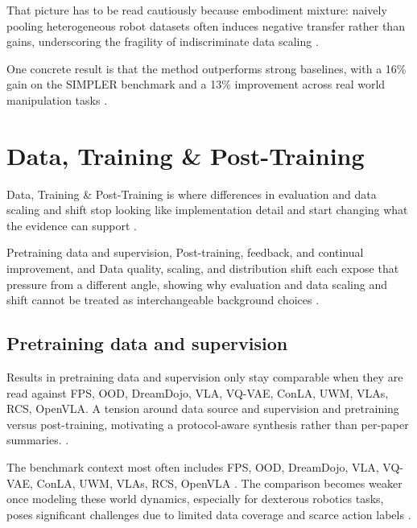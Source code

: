 \documentclass[a4paper,11pt]{article}
\begin{document}
That picture has to be read cautiously because embodiment mixture: naively pooling heterogeneous robot datasets often induces negative transfer rather than gains, underscoring the fragility of indiscriminate data scaling \citep{Wang2026Rethinking}.

One concrete result is that the method outperforms strong baselines, with a 16\% gain on the SIMPLER benchmark and a 13\% improvement across real world manipulation tasks \citep{Routray2025Vipra}.

\section{Data, Training \& Post-Training}


Data, Training \& Post-Training is where differences in evaluation and data scaling and shift stop looking like implementation detail and start changing what the evidence can support \citep{Mu2024Adademo,Hejna2024Optimizing,Lin2026Systematic,Wang2026Rethinking}.

Pretraining data and supervision, Post-training, feedback, and continual improvement, and Data quality, scaling, and distribution shift each expose that pressure from a different angle, showing why evaluation and data scaling and shift cannot be treated as interchangeable background choices \citep{Zhu2025Unified,Cui2026Contact,Dass2025Datamil,Lee2025Class}.

\subsection{Pretraining data and supervision}


Results in pretraining data and supervision only stay comparable when they are read against FPS, OOD, DreamDojo, VLA, VQ-VAE, ConLA, UWM, VLAs, RCS, OpenVLA. A tension around data source and supervision and pretraining versus post-training, motivating a protocol-aware synthesis rather than per-paper summaries. \citep{Mazza2026Improving,Mei2026Video,NVIDIA2025Gr00T,Nasiriany2026Robocasa365}.

The benchmark context most often includes FPS, OOD, DreamDojo, VLA, VQ-VAE, ConLA, UWM, VLAs, RCS, OpenVLA \citep{Gao2026Dreamdojo,Dai2026Conla,Li2025Mask2Iv,Zhu2025Unified}. The comparison becomes weaker once modeling these world dynamics, especially for dexterous robotics tasks, poses significant challenges due to limited data coverage and scarce action labels \citep{Gao2026Dreamdojo}.
\end{document}
